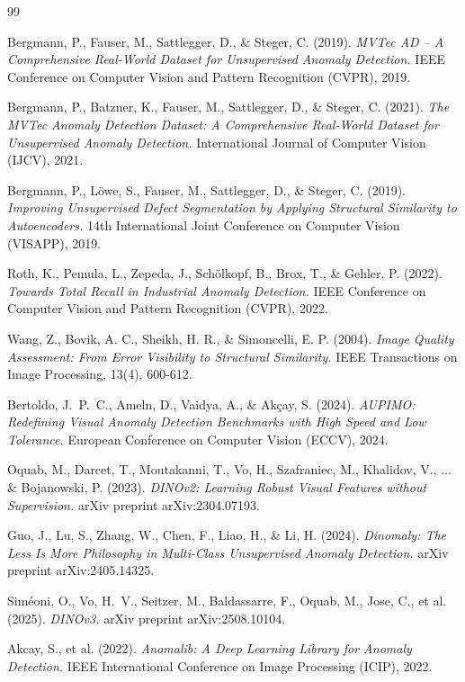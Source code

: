 \documentclass[10pt, a4paper]{article}
\begin{document}
\begin{thebibliography}{99}
\small

Bergmann, P., Fauser, M., Sattlegger, D., \& Steger, C. (2019).
\textit{MVTec AD -- A Comprehensive Real-World Dataset for Unsupervised Anomaly Detection.}
IEEE Conference on Computer Vision and Pattern Recognition (CVPR), 2019.

Bergmann, P., Batzner, K., Fauser, M., Sattlegger, D., \& Steger, C. (2021).
\textit{The MVTec Anomaly Detection Dataset: A Comprehensive Real-World Dataset for Unsupervised Anomaly Detection.}
International Journal of Computer Vision (IJCV), 2021.

Bergmann, P., L{\"o}we, S., Fauser, M., Sattlegger, D., \& Steger, C. (2019).
\textit{Improving Unsupervised Defect Segmentation by Applying Structural Similarity to Autoencoders.}
14th International Joint Conference on Computer Vision (VISAPP), 2019.

Roth, K., Pemula, L., Zepeda, J., Sch{\"o}lkopf, B., Brox, T., \& Gehler, P. (2022).
\textit{Towards Total Recall in Industrial Anomaly Detection.}
IEEE Conference on Computer Vision and Pattern Recognition (CVPR), 2022.

Wang, Z., Bovik, A. C., Sheikh, H. R., \& Simoncelli, E. P. (2004).
\textit{Image Quality Assessment: From Error Visibility to Structural Similarity.}
IEEE Transactions on Image Processing, 13(4), 600-612.

Bertoldo, J.~P.~C., Ameln, D., Vaidya, A., \& Ak\c{c}ay, S. (2024).
\textit{AUPIMO: Redefining Visual Anomaly Detection Benchmarks with High Speed and Low Tolerance.}
European Conference on Computer Vision (ECCV), 2024.

Oquab, M., Darcet, T., Moutakanni, T., Vo, H., Szafraniec, M., Khalidov, V., ... \& Bojanowski, P. (2023).
\textit{DINOv2: Learning Robust Visual Features without Supervision.}
arXiv preprint arXiv:2304.07193.

Guo, J., Lu, S., Zhang, W., Chen, F., Liao, H., \& Li, H. (2024).
\textit{Dinomaly: The Less Is More Philosophy in Multi-Class Unsupervised Anomaly Detection.}
arXiv preprint arXiv:2405.14325.

Sim\'{e}oni, O., Vo, H.~V., Seitzer, M., Baldassarre, F., Oquab, M., Jose, C., et al. (2025).
\textit{DINOv3.}
arXiv preprint arXiv:2508.10104.

Akcay, S., et al. (2022).
\textit{Anomalib: A Deep Learning Library for Anomaly Detection.}
IEEE International Conference on Image Processing (ICIP), 2022.

\normalsize
\end{thebibliography}

\cleardoublepage

\end{document}
